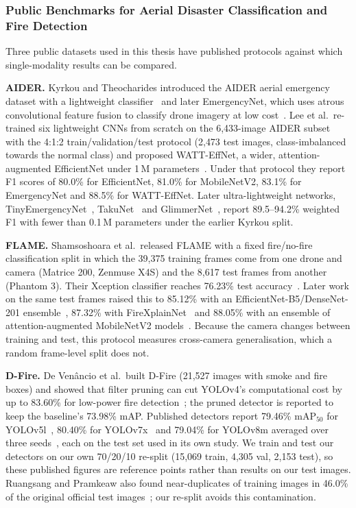 \documentclass[journal]{IEEEtran}
\begin{document}
\subsubsection{Public Benchmarks for Aerial Disaster Classification and Fire Detection}
\label{sec:public_benchmarks_related}

Three public datasets used in this thesis have published protocols against which single-modality results can be compared.

\textbf{AIDER.} Kyrkou and Theocharides introduced the AIDER aerial emergency dataset with a lightweight classifier~\cite{kyrkou2019aider} and later EmergencyNet, which uses atrous convolutional feature fusion to classify drone imagery at low cost~\cite{kyrkou2020emergencynet}. Lee et al.\ re-trained six lightweight CNNs from scratch on the 6{,}433-image AIDER subset with the 4:1:2 train/validation/test protocol (2{,}473 test images, class-imbalanced towards the normal class) and proposed WATT-EffNet, a wider, attention-augmented EfficientNet under 1\,M parameters~\cite{lee2023wattefnet}. Under that protocol they report F1 scores of 80.0\% for EfficientNet, 81.0\% for MobileNetV2, 83.1\% for EmergencyNet and 88.5\% for WATT-EffNet. Later ultra-lightweight networks, TinyEmergencyNet~\cite{mogaka2024tinyemergencynet}, TakuNet~\cite{rossi2025takunet} and GlimmerNet~\cite{nedeljkovic2025glimmernet}, report 89.5--94.2\% weighted F1 with fewer than 0.1\,M parameters under the earlier Kyrkou split.

\textbf{FLAME.} Shamsoshoara et al.\ released FLAME with a fixed fire/no-fire classification split in which the 39{,}375 training frames come from one drone and camera (Matrice 200, Zenmuse X4S) and the 8{,}617 test frames from another (Phantom 3). Their Xception classifier reaches 76.23\% test accuracy~\cite{shamsoshoara2021aerial}. Later work on the same test frames raised this to 85.12\% with an EfficientNet-B5/DenseNet-201 ensemble~\cite{ghali2022uavwildfire}, 87.32\% with FireXplainNet~\cite{khan2024firexplainnet} and 88.05\% with an ensemble of attention-augmented MobileNetV2 models~\cite{deng2025lightweight}. Because the camera changes between training and test, this protocol measures cross-camera generalisation, which a random frame-level split does not.

\textbf{D-Fire.} De Ven\^{a}ncio et al.\ built D-Fire (21{,}527 images with smoke and fire boxes) and showed that filter pruning can cut YOLOv4's computational cost by up to 83.60\% for low-power fire detection~\cite{dfire2022}; the pruned detector is reported to keep the baseline's 73.98\% mAP. Published detectors report 79.46\% $\mathrm{mAP}_{50}$ for YOLOv5l~\cite{venancio2023hybrid}, 80.40\% for YOLOv7x~\cite{goncalves2024yolo} and 79.04\% for YOLOv8m averaged over three seeds~\cite{ruangsang2026crossdataset}, each on the test set used in its own study. We train and test our detectors on our own 70/20/10 re-split (15{,}069 train, 4{,}305 val, 2{,}153 test), so these published figures are reference points rather than results on our test images. Ruangsang and Pramkeaw also found near-duplicates of training images in 46.0\% of the original official test images~\cite{ruangsang2026crossdataset}; our re-split avoids this contamination.
\end{document}
